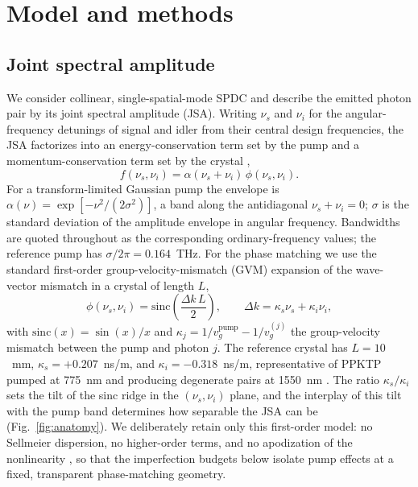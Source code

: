 \section{Model and methods}
\label{sec:model}

\subsection{Joint spectral amplitude}

We consider collinear, single-spatial-mode SPDC and describe the emitted
photon pair by its joint spectral amplitude (JSA). Writing $\nu_s$ and
$\nu_i$ for the angular-frequency detunings of signal and idler from
their central design frequencies, the JSA factorizes into an
energy-conservation term set by the pump and a momentum-conservation
term set by the crystal \cite{grice1997},
\begin{equation}
  f(\nu_s,\nu_i) = \alpha(\nu_s+\nu_i)\,\phi(\nu_s,\nu_i) .
  \label{eq:jsa}
\end{equation}
For a transform-limited Gaussian pump the envelope is
$\alpha(\nu) = \exp[-\nu^2/(2\sigma^2)]$, a band along the antidiagonal
$\nu_s+\nu_i=0$; $\sigma$ is the standard deviation of the amplitude
envelope in angular frequency. Bandwidths are quoted throughout as the
corresponding ordinary-frequency values; the reference pump has
$\sigma/2\pi = 0.164$~THz. For the phase matching we use the standard
first-order group-velocity-mismatch (GVM) expansion of the wave-vector
mismatch in a crystal of length $L$,
\begin{equation}
  \phi(\nu_s,\nu_i) = \mathrm{sinc}\!\left(\frac{\Delta k\,L}{2}\right),
  \qquad
  \Delta k = \kappa_s \nu_s + \kappa_i \nu_i ,
  \label{eq:pm}
\end{equation}
with $\mathrm{sinc}(x)=\sin(x)/x$ and
$\kappa_j = 1/v_g^{\mathrm{pump}} - 1/v_g^{(j)}$ the group-velocity
mismatch between the pump and photon $j$. The reference crystal has
$L = 10$~mm, $\kappa_s = +0.207$~ns/m, and $\kappa_i = -0.318$~ns/m,
representative of PPKTP pumped at 775~nm and producing degenerate pairs
at 1550~nm \cite{grice1997,uren2005,graffitti2018}. The ratio
$\kappa_s/\kappa_i$ sets the tilt of the sinc ridge in the
$(\nu_s,\nu_i)$ plane, and the interplay of this tilt with the pump
band determines how separable the JSA can be
(Fig.~\ref{fig:anatomy}). We deliberately retain only this first-order
model: no Sellmeier dispersion, no higher-order terms, and no
apodization of the nonlinearity \cite{branczyk2011,graffitti2018}, so
that the imperfection budgets below isolate pump effects at a fixed,
transparent phase-matching geometry.

